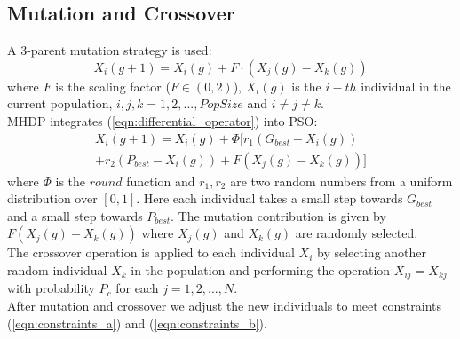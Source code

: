 \subsection{Mutation and Crossover}
A 3-parent mutation strategy is used:
\begin{equation}
    \label{eqn:differential_operator}
    X_i(g+1) = X_i(g) + F \cdot (X_j(g) - X_k(g))
\end{equation}
where \(F\) is the scaling factor (\(F \in (0, 2)\)), \(X_i(g)\) is the $i-th$ individual in the current population, $i, j, k = 1, 2, ..., PopSize$ and $i \neq j \neq k$.\\
MHDP integrates (\ref{eqn:differential_operator}) into PSO:
\begin{equation}
    \begin{aligned}
    \label{eqn:pso}
    X_i(g+1) = X_i(g) + \Phi[r_1(G_{best} - X_i(g)) \\
    + r_2(P_{best} - X_i(g)) + F(X_j(g) - X_k(g))]
    \end{aligned}
\end{equation}
where $\Phi$ is the $round$ function and $r_1, r_2$ are two random numbers
from a uniform distribution over $[0, 1]$. Here each individual takes a small
step towards $G_{best}$ and a small step towards $P_{best}$. The mutation contribution
is given by  $F(X_j(g) - X_k(g))$ where $X_j(g)$ and $X_k(g)$ are randomly selected.\\
The crossover operation is applied to each individual $X_i$ by selecting another random 
individual $X_k$ in the population and performing the operation $X_{ij} = X_{kj}$ with probability $P_c$ for each $j = 1, 2, ..., N$.\\
After mutation and crossover we adjust the new individuals to meet constraints (\ref{eqn:constraints_a}) and (\ref{eqn:constraints_b}).
